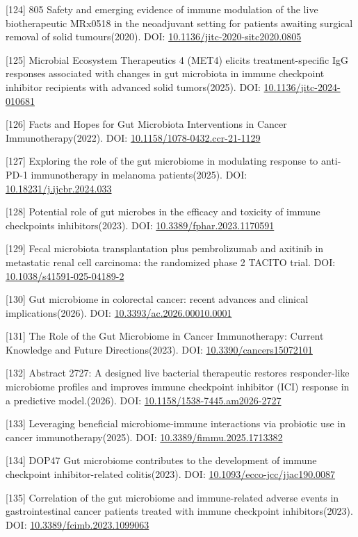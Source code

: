 \documentclass[11pt]{article}
\begin{document}
{[}124{]} 805 Safety and emerging evidence of immune modulation of the live biotherapeutic MRx0518 in the neoadjuvant setting for patients awaiting surgical removal of solid tumours(2020). DOI: \url{10.1136/jitc-2020-sitc2020.0805}

{[}125{]} Microbial Ecosystem Therapeutics 4 (MET4) elicits treatment-specific IgG responses associated with changes in gut microbiota in immune checkpoint inhibitor recipients with advanced solid tumors(2025). DOI: \url{10.1136/jitc-2024-010681}

{[}126{]} Facts and Hopes for Gut Microbiota Interventions in Cancer Immunotherapy(2022). DOI: \url{10.1158/1078-0432.ccr-21-1129}

{[}127{]} Exploring the role of the gut microbiome in modulating response to anti-PD-1 immunotherapy in melanoma patients(2025). DOI: \url{10.18231/j.ijcbr.2024.033}

{[}128{]} Potential role of gut microbes in the efficacy and toxicity of immune checkpoints inhibitors(2023). DOI: \url{10.3389/fphar.2023.1170591}

{[}129{]} Fecal microbiota transplantation plus pembrolizumab and axitinib in metastatic renal cell carcinoma: the randomized phase 2 TACITO trial. DOI: \url{10.1038/s41591-025-04189-2}

{[}130{]} Gut microbiome in colorectal cancer: recent advances and clinical implications(2026). DOI: \url{10.3393/ac.2026.00010.0001}

{[}131{]} The Role of the Gut Microbiome in Cancer Immunotherapy: Current Knowledge and Future Directions(2023). DOI: \url{10.3390/cancers15072101}

{[}132{]} Abstract 2727: A designed live bacterial therapeutic restores responder-like microbiome profiles and improves immune checkpoint inhibitor (ICI) response in a predictive model.(2026). DOI: \url{10.1158/1538-7445.am2026-2727}

{[}133{]} Leveraging beneficial microbiome-immune interactions via probiotic use in cancer immunotherapy(2025). DOI: \url{10.3389/fimmu.2025.1713382}

{[}134{]} DOP47 Gut microbiome contributes to the development of immune checkpoint inhibitor-related colitis(2023). DOI: \url{10.1093/ecco-jcc/jjac190.0087}

{[}135{]} Correlation of the gut microbiome and immune-related adverse events in gastrointestinal cancer patients treated with immune checkpoint inhibitors(2023). DOI: \url{10.3389/fcimb.2023.1099063}
\end{document}
